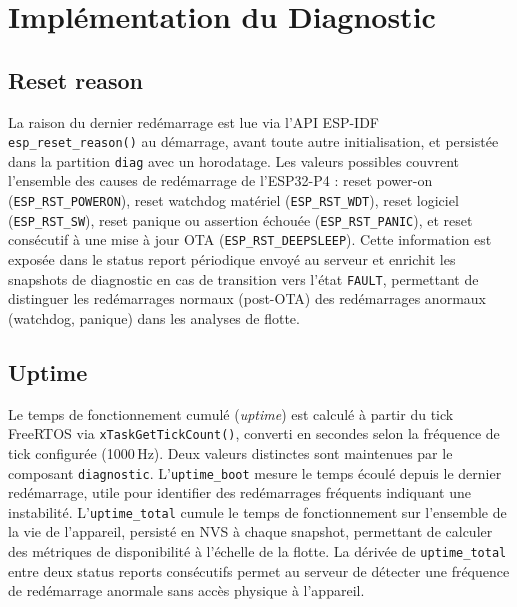 \section{Implémentation du Diagnostic}
\label{sec:diag_impl}

\subsection{Reset reason}
\label{subsec:diag_reset}

La raison du dernier redémarrage est lue via l'API ESP-IDF
\texttt{esp\_reset\_reason()} au démarrage, avant toute autre
initialisation, et persistée dans la partition \texttt{diag} avec
un horodatage. Les valeurs possibles couvrent l'ensemble des causes
de redémarrage de l'ESP32-P4 : reset power-on (\texttt{ESP\_RST\_POWERON}),
reset watchdog matériel (\texttt{ESP\_RST\_WDT}), reset logiciel
(\texttt{ESP\_RST\_SW}), reset panique ou assertion échouée
(\texttt{ESP\_RST\_PANIC}), et reset consécutif à une mise à jour
OTA (\texttt{ESP\_RST\_DEEPSLEEP}). Cette information est exposée
dans le status report périodique envoyé au serveur et enrichit les
snapshots de diagnostic en cas de transition vers l'état \texttt{FAULT},
permettant de distinguer les redémarrages normaux (post-OTA) des
redémarrages anormaux (watchdog, panique) dans les analyses de flotte.

\subsection{Uptime}
\label{subsec:diag_uptime}

Le temps de fonctionnement cumulé (\textit{uptime}) est calculé à
partir du tick FreeRTOS via \texttt{xTaskGetTickCount()}, converti
en secondes selon la fréquence de tick configurée (1000\,Hz). Deux
valeurs distinctes sont maintenues par le composant \texttt{diagnostic}.
L'\texttt{uptime\_boot} mesure le temps écoulé depuis le dernier
redémarrage, utile pour identifier des redémarrages fréquents
indiquant une instabilité. L'\texttt{uptime\_total} cumule le temps
de fonctionnement sur l'ensemble de la vie de l'appareil, persisté
en NVS à chaque snapshot, permettant de calculer des métriques de
disponibilité à l'échelle de la flotte. La dérivée de
\texttt{uptime\_total} entre deux status reports consécutifs permet
au serveur de détecter une fréquence de redémarrage anormale sans
accès physique à l'appareil.

